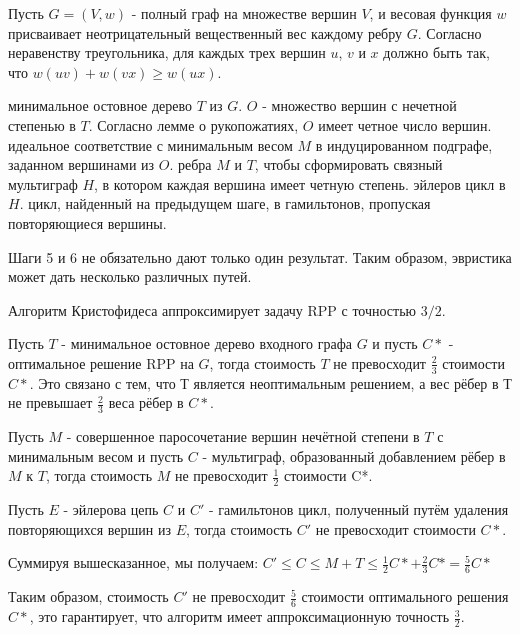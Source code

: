 Пусть $G = (V,w)$ - полный граф на множестве вершин $V$, и весовая функция $w$ присваивает неотрицательный вещественный вес каждому ребру $G$. Согласно неравенству треугольника, для каждых трех вершин $u$, $v$ и $x$ должно быть так, что $w(uv) + w(vx) \geq w(ux)$.

\begin{enumerate}
 минимальное остовное дерево $T$ из $G$.
 $O$ - множество вершин с нечетной степенью в $T$. Согласно лемме о рукопожатиях, $O$ имеет четное число вершин.
 идеальное соответствие с минимальным весом $M$ в индуцированном подграфе, заданном вершинами из $O$.
 ребра $M$ и $T$, чтобы сформировать связный мультиграф $H$, в котором каждая вершина имеет четную степень.
 эйлеров цикл в $H$.
 цикл, найденный на предыдущем шаге, в гамильтонов, пропуская повторяющиеся вершины.
\end{enumerate}
Шаги 5 и 6 не обязательно дают только один результат. Таким образом, эвристика может дать несколько различных путей.

\Th Алгоритм Кристофидеса аппроксимирует задачу RPP с точностью $3/2$.


\Proof
Пусть $T$ - минимальное остовное дерево входного графа $G$ и пусть $C*$ - оптимальное решение RPP на $G$, тогда стоимость $T$ не превосходит $\frac{2}{3}$ стоимости $C*$. Это связано с тем, что $Т$ является неоптимальным решением, а вес рёбер в $Т$ не превышает $\frac{2}{3}$ веса рёбер в $C*$.

Пусть $M$ - совершенное паросочетание вершин нечётной степени в $T$ с минимальным весом и пусть $C$ - мультиграф, образованный добавлением рёбер в $M$ к $T$, тогда стоимость $M$ не превосходит $\frac{1}{2}$ стоимости C*.

Пусть $E$ - эйлерова цепь $C$ и $C'$ - гамильтонов цикл, полученный путём удаления повторяющихся вершин из $E$, тогда стоимость $C'$ не превосходит стоимости $C*$.

Суммируя вышесказанное, мы получаем:
$C' \leq C \leq M + T \leq \frac{1}{2} C* + \frac{2}{3} C* = \frac{5}{6} C*$

Таким образом, стоимость $C'$ не превосходит $\frac{5}{6}$ стоимости оптимального решения $C*$, это гарантирует, что алгоритм имеет аппроксимационную точность $\frac{3}{2}$.

\Endproof